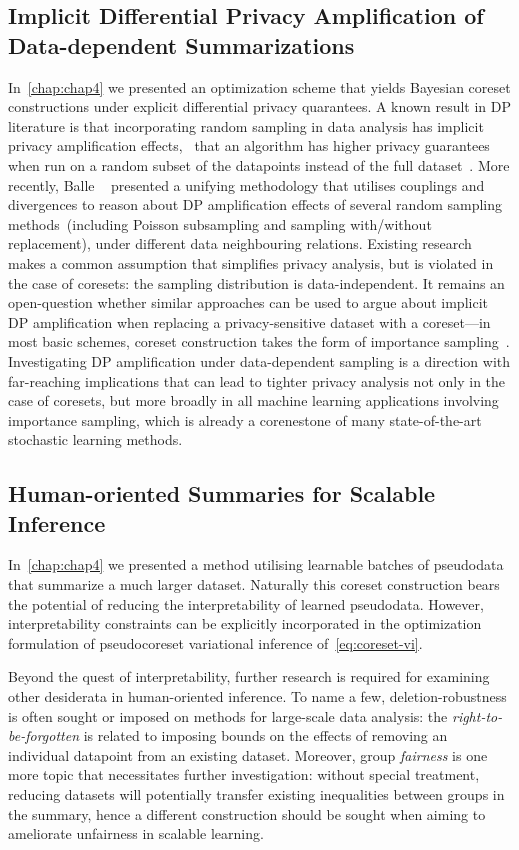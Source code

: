 \subsection{Implicit Differential Privacy Amplification of Data-dependent Summarizations}
\label{subsec:implicit-dp-amplification}

In~\cref{chap:chap4} we presented an optimization scheme that yields Bayesian coreset constructions under explicit differential privacy quarantees. A known result in DP literature is that incorporating random sampling in data analysis has implicit privacy amplification effects, \ie~that an algorithm has higher privacy guarantees when run on a random subset of the datapoints instead of the full dataset~\citep{li12, beimel13, bassily14, abadi16}. More recently, Balle \etal~\citep{balle18} presented a unifying methodology that utilises couplings and divergences to reason about DP amplification effects of several random sampling methods~(including Poisson subsampling and sampling with/without replacement), under different data neighbouring relations. Existing research makes a common assumption that simplifies privacy analysis, but is violated in the case of coresets: the sampling distribution is data-independent. It remains an open-question whether similar approaches can be used to argue about implicit DP amplification when replacing a privacy-sensitive dataset with a coreset---in most basic schemes, coreset construction takes the form of importance sampling~\citep{bachem17}. Investigating DP amplification under data-dependent sampling is a direction with far-reaching implications that can lead to tighter privacy analysis not only in the case of coresets, but more broadly in all machine learning applications involving importance sampling, which is already a corenestone of many state-of-the-art stochastic learning methods. 


\subsection{Human-oriented Summaries for Scalable Inference}
\label{subsec:human-oriented-pseudodata}

In~\cref{chap:chap4} we presented a method utilising learnable batches of pseudodata that summarize a much larger dataset. Naturally this coreset construction bears the potential of reducing the interpretability of learned pseudodata. However, interpretability constraints can be explicitly incorporated in the optimization formulation of pseudocoreset variational inference of~\cref{eq:coreset-vi}.

Beyond the quest of interpretability, further research is required for examining other desiderata in human-oriented inference. To name a few, deletion-robustness is often sought or imposed on methods for large-scale data analysis: the \emph{right-to-be-forgotten} is related to imposing bounds on  the effects of removing an individual datapoint from an existing dataset. Moreover, group \emph{fairness} is one more topic that necessitates further investigation: without special treatment, reducing datasets will potentially transfer existing inequalities between groups in the summary, hence a different construction should be sought when aiming to ameliorate unfairness in scalable learning.  
